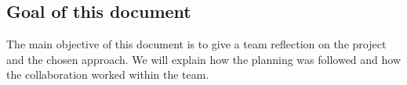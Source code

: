 
\subsection{Goal of this document}
The main objective of this document is to give a team reflection on the project and the chosen approach.
We will explain how the planning was followed and how the collaboration worked within the team.
